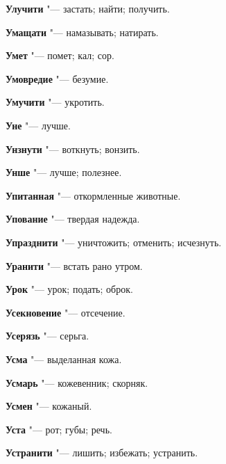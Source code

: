 \begin{mymulticols}{2}
\noindent\textbf{Улучити} "--- застать; найти; получить. 




\noindent\textbf{Умащати} "--- намазывать; натирать. 




\noindent\textbf{Умет} "--- помет; кал; сор. 




\noindent\textbf{Умовредие} "--- безумие. 




\noindent\textbf{Умучити} "--- укротить. 




\noindent\textbf{Уне} "--- лучше. 




\noindent\textbf{Унзнути} "--- воткнуть; вонзить. 




\noindent\textbf{Унше} "--- лучше; полезнее. 




\noindent\textbf{Упитанная} "--- откормленные животные. 




\noindent\textbf{Упование} "--- твердая надежда. 




\noindent\textbf{Упразднити} "--- уничтожить; отменить; исчезнуть. 




\noindent\textbf{Уранити} "--- встать рано утром. 




\noindent\textbf{Урок} "--- урок; подать; оброк. 




\noindent\textbf{Усекновение} "--- отсечение. 




\noindent\textbf{Усерязь} "--- серьга. 




\noindent\textbf{Усма} "--- выделанная кожа. 




\noindent\textbf{Усмарь} "--- кожевенник; скорняк. 




\noindent\textbf{Усмен} "--- кожаный. 




\noindent\textbf{Уста} "--- рот; губы; речь. 




\noindent\textbf{Устранити} "--- лишить; избежать; устранить. 





\end{mymulticols}
